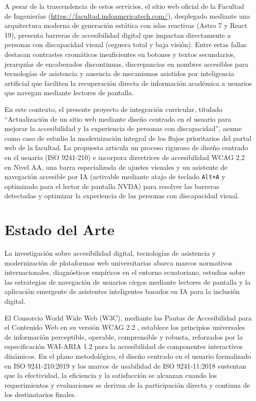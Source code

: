 A pesar de la trascendencia de estos servicios, el sitio web oficial de la Facultad de Ingenierías (\url{https://facultad.indoamericatech.com/}), desplegado mediante una arquitectura moderna de generación estática con islas reactivas (Astro 7 y React 19), presenta barreras de accesibilidad digital que impactan directamente a personas con discapacidad visual (ceguera total y baja visión). Entre estas fallas destacan contrastes cromáticos insuficientes en botones y textos secundarios, jerarquías de encabezados discontinuas, discrepancias en nombres accesibles para tecnologías de asistencia y ausencia de mecanismos asistidos por inteligencia artificial que faciliten la recuperación directa de información académica a usuarios que navegan mediante lectores de pantalla.

En este contexto, el presente proyecto de integración curricular, titulado ``Actualización de un sitio web mediante diseño centrado en el usuario para mejorar la accesibilidad y la experiencia de personas con discapacidad'', asume como caso de estudio la modernización integral de los flujos prioritarios del portal web de la facultad. La propuesta articula un proceso riguroso de diseño centrado en el usuario (ISO 9241-210) e incorpora directrices de accesibilidad WCAG 2.2 en Nivel AA, una barra especializada de ajustes visuales y un asistente de navegación accesible por IA (activable mediante atajo de teclado \texttt{Alt+A} y optimizado para el lector de pantalla NVDA) para resolver las barreras detectadas y optimizar la experiencia de las personas con discapacidad visual.

\section{Estado del Arte}
La investigación sobre accesibilidad digital, tecnologías de asistencia y modernización de plataformas web universitarias abarca marcos normativos internacionales, diagnósticos empíricos en el entorno ecuatoriano, estudios sobre las estrategias de navegación de usuarios ciegos mediante lectores de pantalla y la aplicación emergente de asistentes inteligentes basados en IA para la inclusión digital.

El Consorcio World Wide Web (W3C), mediante las Pautas de Accesibilidad para el Contenido Web en su versión WCAG 2.2 \cite{wcag22}, establece los principios universales de información perceptible, operable, comprensible y robusta, reforzados por la especificación WAI-ARIA 1.2 \cite{wai_aria12} para la accesibilidad de componentes interactivos dinámicos. En el plano metodológico, el diseño centrado en el usuario formalizado en ISO 9241-210:2019 \cite{iso9241_210_2019} y los marcos de usabilidad de ISO 9241-11:2018 \cite{iso9241_11_2018} sustentan que la efectividad, la eficiencia y la satisfacción se alcanzan cuando los requerimientos y evaluaciones se derivan de la participación directa y continua de los destinatarios finales.

